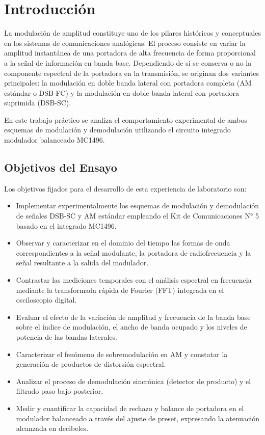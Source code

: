 \chapter{Introducción}
\label{sec.ej3:introduccion}

La modulación de amplitud constituye uno de los pilares históricos y conceptuales en los sistemas de comunicaciones
analógicas. El proceso consiste en variar la amplitud instantánea de una portadora de alta frecuencia de forma
proporcional a la señal de información en banda base. Dependiendo de si se conserva o no la componente espectral de la
portadora en la transmisión, se originan dos variantes principales: la modulación en doble banda lateral con portadora
completa (AM estándar o DSB-FC) y la modulación en doble banda lateral con portadora suprimida (DSB-SC).

En este trabajo práctico se analiza el comportamiento experimental de ambos esquemas de modulación y demodulación
utilizando el circuito integrado modulador balanceado MC1496.

\section{Objetivos del Ensayo}
Los objetivos fijados para el desarrollo de esta experiencia de laboratorio son:
\begin{itemize}
    \item Implementar experimentalmente los esquemas de modulación y demodulación de señales DSB-SC y AM estándar
          empleando el Kit de Comunicaciones N° 5 basado en el integrado MC1496.
    \item Observar y caracterizar en el dominio del tiempo las formas de onda correspondientes a la señal modulante,
          la portadora de radiofrecuencia y la señal resultante a la salida del modulador.
    \item Contrastar las mediciones temporales con el análisis espectral en frecuencia mediante la transformada rápida
          de Fourier (FFT) integrada en el osciloscopio digital.
    \item Evaluar el efecto de la variación de amplitud y frecuencia de la banda base sobre el índice de modulación,
          el ancho de banda ocupado y los niveles de potencia de las bandas laterales.
    \item Caracterizar el fenómeno de sobremodulación en AM y constatar la generación de productos de distorsión
          espectral.
    \item Analizar el proceso de demodulación sincrónica (detector de producto) y el filtrado paso bajo posterior.
    \item Medir y cuantificar la capacidad de rechazo y balance de portadora en el modulador balanceado a través
          del ajuste de preset, expresando la atenuación alcanzada en decibeles.
\end{itemize}


